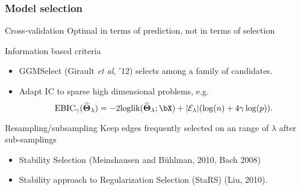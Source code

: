 \begin{frame}
  \frametitle{Model selection}
  
  \begin{block}{Cross-validation}
    Optimal in terms of \alert{prediction}, not in terms of selection
  \end{block}

  \begin{block}{Information based criteria}
    \begin{itemize}
    \item GGMSelect (Girault \textit{et al}, '12) selects among a family of candidates.
    \item Adapt IC to sparse high dimensional problems, e.g.
    \begin{equation*}
      \text{EBIC}_\gamma(\widehat{{\boldsymbol\Theta}}_\lambda)  =   -2 \textrm{loglik}
      (\widehat{{\boldsymbol\Theta}}_\lambda;\bX) + |\mathcal{E}_\lambda| (\log(n) + 4 \gamma \log(p) ).
    \end{equation*}
    \end{itemize}
  \end{block}

  \begin{block}{Resampling/subsampling}
    \alert{Keep edges frequently selected} on an range of $\lambda$ after sub-samplings
    \begin{itemize}
    \item Stability Selection (Meinshausen and B\"uhlman, 2010, Bach 2008)
    \item Stability approach to Regularization Selection (StaRS) (Liu, 2010).
    \end{itemize}
  \end{block}
\end{frame}




